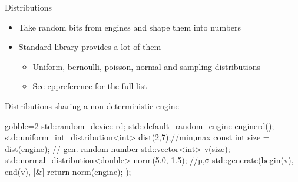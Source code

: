 \begin{frame}[fragile]
  \begin{block}{Distributions}
    \begin{itemize}
      \item Take random bits from engines and shape them into numbers
      \item Standard library provides a lot of them
      \begin{itemize}
        \item Uniform, bernoulli, poisson, normal and sampling distributions
        \item See \href{https://en.cppreference.com/w/cpp/numeric/random}{cppreference} for the full list
      \end{itemize}
    \end{itemize}
  \end{block}
  \begin{exampleblock}{Distributions sharing a non-deterministic engine}
    \begin{cppcode*}{gobble=2}
      std::random_device rd;
      std::default_random_engine engine{rd()};
      std::uniform_int_distribution<int> dist(2,7);//min,max
      const int size = dist(engine); // gen. random number
      std::vector<int> v(size);
      std::normal_distribution<double> norm(5.0, 1.5); //µ,σ
      std::generate(begin(v), end(v),
                    [&]{ return norm(engine); });
    \end{cppcode*}
  \end{exampleblock}
\end{frame}

